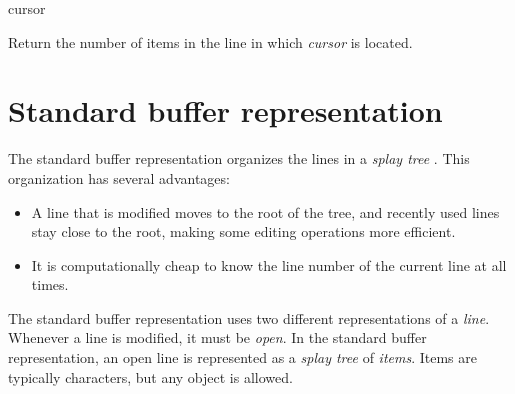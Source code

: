  {cursor}

Return the number of items in the line in which \textit{cursor} is
located.

\section{Standard buffer representation}

The standard buffer representation organizes the lines in a
\emph{splay tree} \cite{Sleator:1985:SBS:3828.3835}.  This
organization has several advantages:

\begin{itemize}
\item A line that is modified moves to the root of the tree, and
  recently used lines stay close to the root, making some editing
  operations more efficient.
\item It is computationally cheap to know the line number of the
  current line at all times. 
\end{itemize}

The standard buffer representation uses two different representations
of a \emph{line}.  Whenever a line is modified, it must be
\emph{open}.  In the standard buffer representation, an open line is
represented as a \emph{splay tree} \cite{Sleator:1985:SBS:3828.3835}
of \emph{items}.  Items are typically characters, but any object is
allowed.

